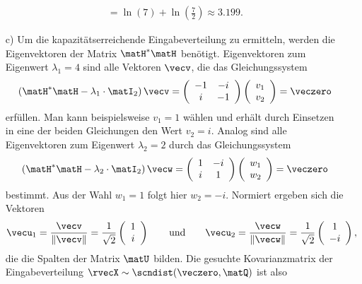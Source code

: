 \begin{itemize}
\begin{align*}
=\ln\left(7\right) + \ln\left(\frac{7}{2}\right)\approx 3.199.
\end{align*}
\item[c)] Um die kapazitätserreichende Eingabeverteilung zu ermitteln, werden die Eigenvektoren
der Matrix $\matH^*\matH$ benötigt. Eigenvektoren zum Eigenwert $\lambda_1=4$ sind alle
Vektoren $\vecv$, die das Gleichungssystem
\begin{align*}
\left(\matH^*\matH-\lambda_1\cdot\matI_2\right)\vecv=\left(\begin{array}{cc}
-1 & -i \\
i & -1 \\
\end{array}\right)\left(\begin{array}{c}
v_1 \\ v_2 \\
\end{array}\right)=\veczero
\end{align*}
erfüllen. Man kann beispielsweise $v_1=1$ wählen und erhält durch Einsetzen in eine der
beiden Gleichungen den Wert $v_2=i$. Analog sind alle Eigenvektoren zum Eigenwert
$\lambda_2=2$ durch das Gleichungssystem
\begin{align*}
\left(\matH^*\matH-\lambda_2\cdot\matI_2\right)\vecw=\left(\begin{array}{cc}
1 & -i \\
i & 1 \\
\end{array}\right)\left(\begin{array}{c}
w_1 \\ w_2 \\
\end{array}\right)=\veczero
\end{align*}
bestimmt. Aus der Wahl $w_1=1$ folgt hier $w_2=-i$.
Normiert ergeben sich die Vektoren
\begin{align*}
\vecu_1=\frac{\vecv}{\|\vecv\|}=\frac{1}{\sqrt{2}}\left(\begin{array}{c}
1 \\ i \\
\end{array}\right) \qquad \text{und} \qquad \vecu_2=\frac{\vecw}{\|\vecw\|}=\frac{1}{\sqrt{2}}\left(\begin{array}{c}
1 \\ -i \\
\end{array}\right),
\end{align*}
die die Spalten der Matrix $\matU$ bilden.
Die gesuchte Kovarianzmatrix der Eingabeverteilung $\rvecX\sim\scndist(\veczero,\matQ)$ ist also

\end{itemize}
